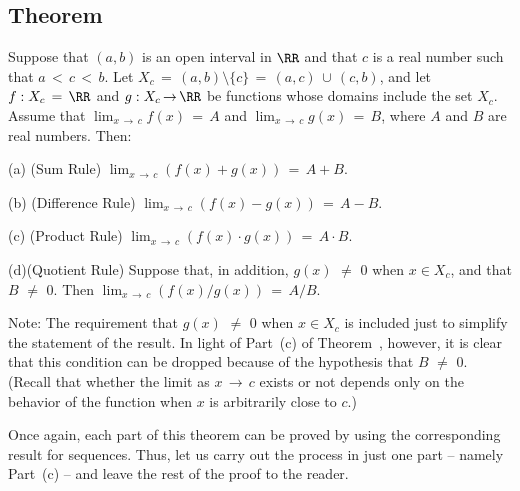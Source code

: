 {\V
\V

            \subsection{\small{\bf Theorem}}
            \label{ThmC90.70}

        Suppose that $(a,b)$ is an open interval in ${\RR}$ and that $c$ is a real number such that $a\,<\,c\,<\,b$.
    Let $X_{c} \,=\, (a,b){\setminus}\{c\} \,=\, (a,c)\,{\cup}\,(c,b)$, and let $f:X_{c} \,=\, {\RR}$ and $g:X_{c} \,{\rightarrow}\, {\RR}$ be functions whose domains include the set $X_{c}$.
    Assume that ${\displaystyle \lim_{x \,{\rightarrow}\, c} f(x) \,=\, A}$ and ${\displaystyle \lim_{x \,{\rightarrow}\, c} g(x) \,=\, B}$,
    where $A$ and $B$ are real numbers.
    Then:

\V
        (a) (Sum Rule) ${\displaystyle \lim_{x \,{\rightarrow}\, c} (f(x)+g(x)) \,=\, A+B}$.

\V

        (b) (Difference Rule) ${\displaystyle \lim_{x \,{\rightarrow}\, c} (f(x)-g(x)) \,=\, A-B}$.

\V

        (c) (Product Rule) ${\displaystyle \lim_{x \,{\rightarrow}\, c} (f(x){\cdot}g(x)) \,=\, A{\cdot}B}$.

\V

        (d)(Quotient Rule) Suppose that, in addition, $g(x) \,\,{\neq}\,\, 0$ when $x{\in}X_{c}$, and that $B \,\,{\neq}\,\, 0$.
    Then ${\displaystyle \lim_{x \,{\rightarrow}\, c} (f(x)/g(x)) \,=\, A/B}$.

    Note: The requirement that $g(x) \,\,{\neq}\,\, 0$ when $x{\in}X_{c}$ is included just to simplify the statement of the result.
    In light of Part~(c) of Theorem~, however, it is clear that this condition can be dropped because of the hypothesis that $B \,\,{\neq}\,\, 0$.
    (Recall that whether the limit as $x \,{\rightarrow}\, c$ exists or not depends only on the behavior of the function when $x$ is arbitrarily close to $c$.)

\V

        Once again, each part of this theorem can be proved by using the corresponding result for sequences.
    Thus, let us carry out the process in just one part -- namely Part~(c) -- and leave the rest of the proof to the reader.


\V

}
